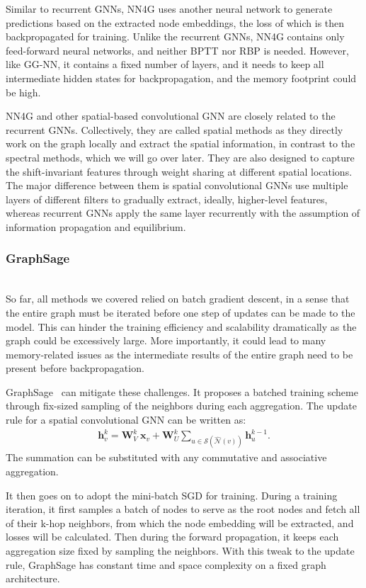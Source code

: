 Similar to recurrent GNNs, NN4G uses another neural network to generate predictions based on the extracted node embeddings, the loss of which is then backpropagated for training. Unlike the recurrent GNNs, NN4G contains only feed-forward neural networks, and neither BPTT nor RBP is needed. However, like GG-NN, it contains a fixed number of layers, and it needs to keep all intermediate hidden states for backpropagation, and the memory footprint could be high. 

NN4G and other spatial-based convolutional GNN are closely related to the recurrent GNNs. Collectively, they are called spatial methods as they directly work on the graph locally and extract the spatial information, in contrast to the spectral methods, which we will go over later. They are also designed to capture the shift-invariant features through weight sharing at different spatial locations. The major difference between them is spatial convolutional GNNs use multiple layers of different filters to gradually extract, ideally, higher-level features, whereas recurrent GNNs apply the same layer recurrently with the assumption of information propagation and equilibrium. 

\subsubsection{GraphSage} \hfill \\
So far, all methods we covered relied on batch gradient descent, in a sense that the entire graph must be iterated before one step of updates can be made to the model. This can hinder the training efficiency and scalability dramatically as the graph could be excessively large. More importantly, it could lead to many memory-related issues as the intermediate results of the entire graph need to be present before backpropagation.

GraphSage~\cite{graphsage} can mitigate these challenges. It proposes a batched training scheme through fix-sized sampling of the neighbors during each aggregation. The update rule for a spatial convolutional GNN can be written as:
\begin{gather}
\label{eq:graphsage}
\mathbf{h}_v ^k = \mathbf{W}_V^k~\mathbf{x}_v + \mathbf{W}_U^k \sum_{u \in \mathcal{S}(\hat {\mathcal {N}}(v))} \mathbf{h}_u^{k-1}.
\end{gather}
The summation can be substituted with any commutative and associative aggregation.

It then goes on to adopt the mini-batch SGD for training. During a training iteration, it first samples a batch of nodes to serve as the root nodes and fetch all of their k-hop neighbors, from which the node embedding will be extracted, and losses will be calculated. Then during the forward propagation, it keeps each aggregation size fixed by sampling the neighbors. With this tweak to the update rule, GraphSage has constant time and space complexity on a fixed graph architecture. 

